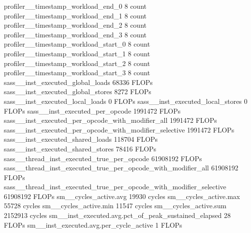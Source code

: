 profiler__timestamp_workload_end_0                                                             8 count
profiler__timestamp_workload_end_1                                                             8 count
profiler__timestamp_workload_end_2                                                             8 count
profiler__timestamp_workload_end_3                                                             8 count
profiler__timestamp_workload_start_0                                                           8 count
profiler__timestamp_workload_start_1                                                           8 count
profiler__timestamp_workload_start_2                                                           8 count
profiler__timestamp_workload_start_3                                                           8 count
sass__inst_executed_global_loads                                                           68336 FLOPs
sass__inst_executed_global_stores                                                           8272 FLOPs
sass__inst_executed_local_loads                                                                0 FLOPs
sass__inst_executed_local_stores                                                               0 FLOPs
sass__inst_executed_per_opcode                                                           1991472 FLOPs
sass__inst_executed_per_opcode_with_modifier_all                                         1991472 FLOPs
sass__inst_executed_per_opcode_with_modifier_selective                                   1991472 FLOPs
sass__inst_executed_shared_loads                                                          118704 FLOPs
sass__inst_executed_shared_stores                                                          78416 FLOPs
sass__thread_inst_executed_true_per_opcode                                              61908192 FLOPs
sass__thread_inst_executed_true_per_opcode_with_modifier_all                            61908192 FLOPs
sass__thread_inst_executed_true_per_opcode_with_modifier_selective                      61908192 FLOPs
sm__cycles_active.avg                                                                      19930 cycles
sm__cycles_active.max                                                                      55728 cycles
sm__cycles_active.min                                                                      11547 cycles
sm__cycles_active.sum                                                                    2152913 cycles
sm__inst_executed.avg.pct_of_peak_sustained_elapsed                                           28 FLOPs
sm__inst_executed.avg.per_cycle_active                                                         1 FLOPs
